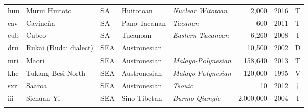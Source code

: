 \begin{table}
\begin{tabularx}{\textwidth}{lQlQQrlc}
 huu & {{Murui Huitoto}} &  SA & {Huitotoan} & {\textit{Nuclear Witotoan}} &  2,000 & 2016 & T\\
 cav & {{Cavineña}} &  SA & {Pano-Tacanan} & {\textit{Tacanan}} &  600 & 2011 & T\\
 cub & {{Cubeo}} &  SA & {Tucanoan} & {\textit{Eastern Tucanoan}} &  6,260 & 2008 & I\\
 dru & {{Rukai (Budai dialect)}} &  SEA & {Austronesian} &  &  10,500 & 2002 & D\\
 mri & {{Maori}} &  SEA  & {Austronesian} & {\textit{Malayo-Polynesian}} &  158,640 & 2013 & T\\
 khc & {{Tukang Besi North}} &  SEA  & {Austronesian} & {\textit{Malayo-Polynesian}} &  120,000 & 1995 & V\\
 sxr & {{Saaroa}} &  SEA  & {Austronesian} & {\textit{Tsouic}} &  10 & 2012 & †\\
 iii & {{Sichuan Yi}} &  SEA & {Sino-Tibetan} & {\textit{Burmo-Qiangic}} &  2,000,000 & 2004 & I\\
 \lspbottomrule
\end{tabularx}
\end{table}


